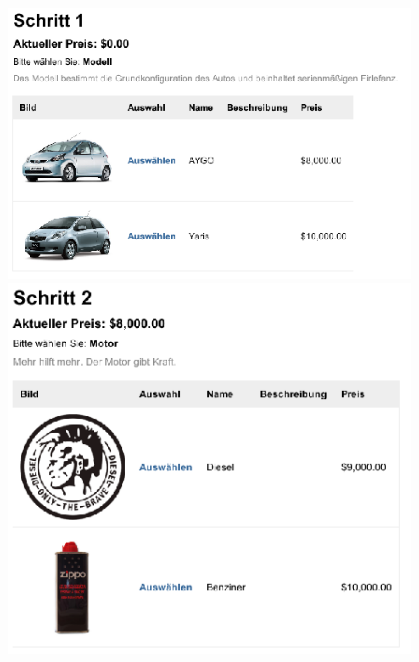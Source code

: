 \documentclass[a4paper,10pt]{article}
\begin{document}
\includegraphics[width=0.8\textwidth]{screenshots/sequence1.png}
\\
\includegraphics[width=0.8\textwidth]{screenshots/sequence3.png}
\end{document}
